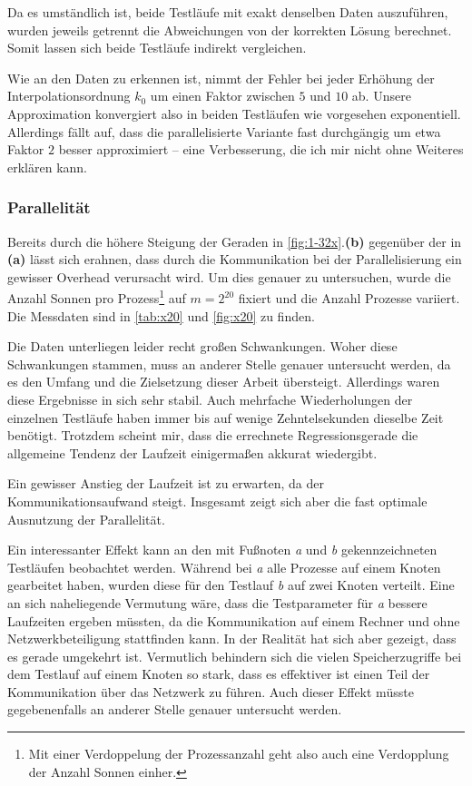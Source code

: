  Da es umständlich ist, beide Testläufe mit exakt denselben Daten auszuführen, wurden jeweils getrennt die Abweichungen von der korrekten Lösung berechnet. Somit lassen sich beide Testläufe
  indirekt vergleichen.
  
  Wie an den Daten zu erkennen ist, nimmt der Fehler bei jeder Erhöhung der Interpolationsordnung $k_0$ um einen Faktor zwischen $5$ und $10$ ab. Unsere Approximation konvergiert also in
  beiden Testläufen wie vorgesehen exponentiell. Allerdings fällt auf, dass die parallelisierte Variante fast durchgängig um etwa Faktor $2$ besser approximiert -- eine Verbesserung, die ich mir 
  nicht ohne Weiteres erklären kann.
  
  \subsubsection{Parallelität}
  
  Bereits durch die höhere Steigung der Geraden in \autoref{fig:1-32x}.\textbf{(b)} gegenüber der in \textbf{(a)} lässt sich erahnen, dass durch die Kommunikation bei der Parallelisierung ein gewisser
  Overhead verursacht wird. Um dies genauer zu untersuchen, wurde die Anzahl Sonnen pro Prozess\footnote{Mit einer Verdoppelung der Prozessanzahl geht also auch eine Verdopplung der Anzahl Sonnen 
  einher.} auf $m = 2^{20}$ fixiert und die Anzahl Prozesse variiert.  Die Messdaten sind in \autoref{tab:x20} und \autoref{fig:x20} zu finden. 
  
  Die Daten unterliegen leider recht großen Schwankungen. Woher diese Schwankungen stammen, muss an anderer Stelle genauer untersucht werden, da es den Umfang und die Zielsetzung dieser Arbeit 
  übersteigt. Allerdings waren diese Ergebnisse in sich sehr stabil. Auch mehrfache Wiederholungen der einzelnen Testläufe haben immer bis auf wenige Zehntelsekunden dieselbe Zeit benötigt. 
  Trotzdem scheint mir, dass die errechnete Regressionsgerade die allgemeine Tendenz der Laufzeit einigermaßen akkurat wiedergibt.
  
  Ein gewisser Anstieg der Laufzeit ist zu erwarten, da der Kommunikationsaufwand steigt. Insgesamt zeigt sich aber die fast optimale Ausnutzung der Parallelität.
  
  Ein interessanter Effekt kann an den mit Fußnoten \textit{a} und \textit{b} gekennzeichneten Testläufen beobachtet werden. Während bei \textit{a} alle Prozesse auf einem Knoten gearbeitet haben, 
  wurden diese für den Testlauf \textit{b} auf zwei Knoten verteilt. Eine an sich naheliegende Vermutung wäre, dass die Testparameter für \textit{a} bessere Laufzeiten ergeben müssten,
  da die Kommunikation auf einem Rechner und ohne Netzwerkbeteiligung stattfinden kann. In der Realität hat sich aber gezeigt, dass es gerade umgekehrt ist. Vermutlich behindern sich die vielen 
  Speicherzugriffe bei dem Testlauf auf einem Knoten so stark, dass es effektiver ist einen Teil der Kommunikation über das Netzwerk zu führen. Auch dieser Effekt müsste gegebenenfalls an anderer Stelle 
  genauer untersucht werden.
  
